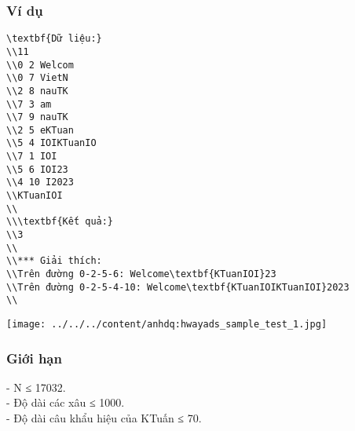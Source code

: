 \subsubsection{   Ví dụ  }
\begin{verbatim}
\textbf{Dữ liệu:}
\\11
\\0 2 Welcom
\\0 7 VietN
\\2 8 nauTK
\\7 3 am
\\7 9 nauTK
\\2 5 eKTuan
\\5 4 IOIKTuanIO
\\7 1 IOI
\\5 6 IOI23
\\4 10 I2023
\\KTuanIOI
\\
\\\textbf{Kết quả:}
\\3
\\
\\*** Giải thích:
\\Trên đường 0-2-5-6: Welcome\textbf{KTuanIOI}23
\\Trên đường 0-2-5-4-10: Welcome\textbf{KTuanIOIKTuanIOI}2023
\\\end{verbatim}


\texttt{[image: ../../../content/anhdq:hwayads\_sample\_test\_1.jpg]}

\subsubsection{   Giới hạn  }

   - N ≤ 17032.   
\\   - Độ dài các xâu ≤ 1000.   
\\   - Độ dài câu khẩu hiệu của KTuấn ≤ 70.  

